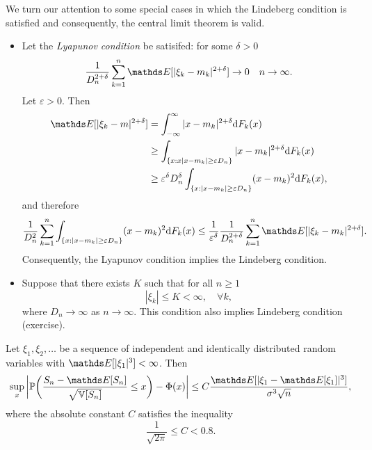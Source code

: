 We turn our attention to some special cases in which the Lindeberg condition is satisfied and consequently, the central limit theorem is valid.
\begin{itemize}
    \item Let the \textit{Lyapunov condition} be satisifed: for some $\delta > 0$
    \begin{equation*}
        \frac{1}{D_n^{2 +\delta}} \sum_{k=1}^n \E[|\xi_k - m_k|^{2+\delta}] \to 0 \quad n \to \infty.
    \end{equation*}
    Let $\varepsilon > 0$. Then
    \begin{align*}
        \E[|\xi_k - m|^{2+\delta}] &= \int_{-\infty}^\infty |x - m_k|^{2+\delta} \d F_k(x)\\
        &\ge \int_{\{x: x|x-m_k| \ge \varepsilon D_n\}} |x - m_k|^{2+\delta}  \d F_k(x)\\
        &\ge \varepsilon^\delta D_n^\delta \int_{\{x: |x-m_k| \ge \varepsilon D_n\}} (x - m_k)^{2}  \d F_k(x),
    \end{align*}
    and therefore 
    \begin{equation*}
        \frac{1}{D_n^2}\sum_{k=1}^n \int_{\{x: |x-m_k| \ge \varepsilon D_n\}} (x - m_k)^{2}  \d F_k(x) \le \frac{1}{\varepsilon^\delta} \frac{1}{D_n^{2 + \delta}} \sum_{k=1}^n \E[|\xi_k - m_k|^{2 + \delta}].
    \end{equation*}
    Consequently, the Lyapunov condition implies the Lindeberg condition.
    \item Suppose that there exists $K$ such that for all $n \ge 1$
    \begin{equation*}
        |\xi_k| \le K < \infty, \quad \forall k,
    \end{equation*}
    where $D_n \to \infty$ as $n \to \infty$. This condition also implies Lindeberg condition (exercise).
\end{itemize}
\begin{theorem}
Let $\xi_1, \xi_2, \dots$ be a sequence of independent and identically distributed random variables with $\E[|\xi_1|^3] < \infty$. Then
\begin{equation*}
    \sup_x \bigg| \p\bigg( \frac{S_n - \E[S_n]}{\sqrt{\V[S_n]}} \le x\bigg) - \Phi(x) \bigg| \le C\frac{\E[|\xi_1 - \E[\xi_1]|^3]}{\sigma^3\sqrt{n}},
\end{equation*}
where the absolute constant $C$ satisfies the inequality
\begin{equation*}
    \frac{1}{\sqrt{2\pi}} \le C < 0.8.
\end{equation*}
\end{theorem}
